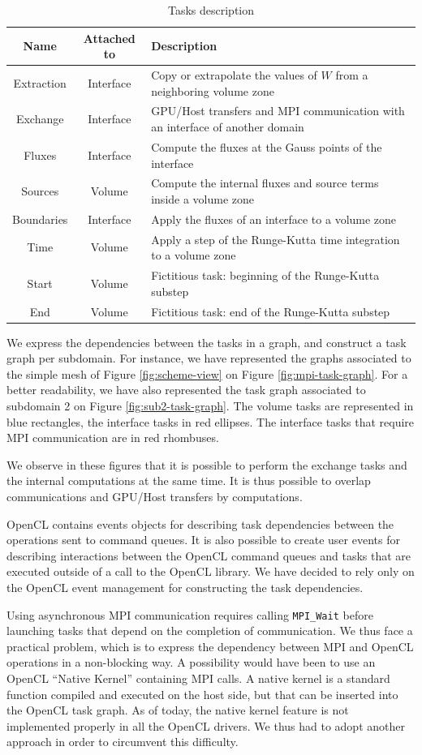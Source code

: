 \documentclass[12pt]{amsart}
\begin{document}
\begin{table}[h]
  \centering
\begin{tabular}{|c|c|m{4cm}|}
\hline
Name & Attached to & Description\tabularnewline
\hline
\hline
Extraction & Interface & Copy or extrapolate the values of $W$ from a neighboring volume
zone \tabularnewline
\hline
Exchange & Interface & GPU/Host transfers and MPI communication with an interface of another domain\tabularnewline
\hline
Fluxes & Interface & Compute the fluxes at the Gauss points of the interface\tabularnewline
\hline
Sources & Volume & Compute the internal fluxes and source terms inside a volume zone\tabularnewline
\hline
Boundaries & Interface & Apply the fluxes of an interface to a volume zone\tabularnewline
\hline
Time & Volume & Apply a step of the Runge-Kutta time integration to a volume zone\tabularnewline
\hline
Start & Volume & Fictitious task: beginning of the Runge-Kutta substep\tabularnewline
\hline
End & Volume & Fictitious task: end of the Runge-Kutta substep\tabularnewline
\hline
\end{tabular}
  \caption{Tasks description}
  \label{tab:tasks}
\end{table}

We express the dependencies between the tasks in a graph, and construct a task graph per subdomain. For instance, we have represented the graphs associated to the simple mesh of Figure \ref{fig:scheme-view} on Figure \ref{fig:mpi-task-graph}. For a better readability, we have also represented the task graph associated to subdomain 2 on Figure \ref{fig:sub2-task-graph}. The volume tasks are represented in blue rectangles,  the interface tasks in red ellipses. The interface tasks that require MPI communication are in red rhombuses.

We observe in these figures that it is possible to perform the exchange tasks and the internal computations at the same time. It is thus possible to overlap communications and GPU/Host transfers by computations.

OpenCL contains events objects for describing task dependencies between the operations sent to command queues. It is also possible to create user events for describing interactions between the OpenCL command queues and tasks that are executed outside of a call to the OpenCL library. We have decided to rely only on the OpenCL event management for constructing the task dependencies.

Using asynchronous MPI communication requires calling
\texttt{MPI\_Wait} before launching tasks that depend on the
completion of communication. We thus face a practical problem, which
is to express the dependency between MPI and OpenCL operations in a
non-blocking way. A possibility would have been to use an OpenCL
``Native Kernel'' containing MPI calls. A native kernel is a standard
function compiled and executed on the host side, but that can be
inserted into the OpenCL task graph. As of today, the native kernel
feature is not implemented properly in all the OpenCL drivers. We thus
had to adopt another approach in order to circumvent this difficulty.
\end{document}
